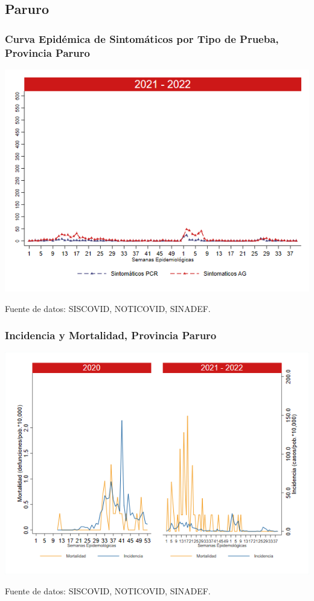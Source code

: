 \documentclass[xcolor=table]{beamer}
\begin{document}
\subsection{Paruro}
\begin{frame}[label=Paruro]
	\frametitle{Curva Epidémica de Sintomáticos por Tipo de Prueba, Provincia Paruro}
	\vspace{-.5cm}
	\begin{center}
		\includegraphics[width=0.8\linewidth, trim={0cm .5cm 0cm 0.2cm},clip]{../figuras/sinto_prueba20_21_10.png}
	\end{center}
	{\tiny Fuente de datos: SISCOVID, NOTICOVID, SINADEF.}
	\hyperlink{TipoPrueba}{}
\end{frame}

\begin{frame}[label=Paruro]
	\frametitle{Incidencia y Mortalidad, Provincia Paruro}
	\vspace{-.5cm}
	\begin{center}
		\includegraphics[width=0.8\linewidth, trim={0cm .5cm 0cm 0.2cm},clip]{../figuras/incidencia_mortalidad_20_21_10.png}
	\end{center}
	{\tiny Fuente de datos: SISCOVID, NOTICOVID, SINADEF.}
\end{frame}
\end{document}
